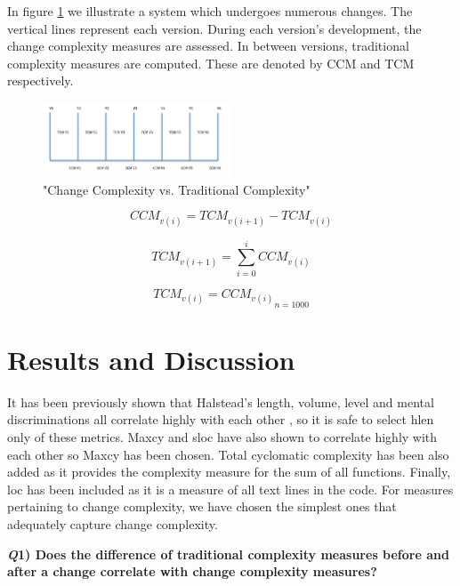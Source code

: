 \documentclass[9pt,twocolumn,a4paper]{article}
\begin{document}
In figure \ref{fig:ccVstc} we illustrate a system which undergoes numerous changes. The vertical lines represent each version. During each version's development, the change complexity measures are assessed. In between versions, traditional complexity measures are computed. These are denoted by CCM and TCM respectively.

\begin{figure}[h!]
  \centering
  \includegraphics[width=0.5\textwidth]{change_complexity_figure}
   \caption{"Change Complexity vs. Traditional Complexity"}
   \label{fig:ccVstc}
\end{figure}

\begin{equation}
{{CCM_{v(i)}} = {TCM_{v(i+1)}}-{TCM_{v(i)}}}
\end{equation}

\begin{equation}
{{TCM_{v(i+1)}} = \sum\limits_{i=0}^iCCM_{v(i)}}
\end{equation}
 
\begin{equation}
{{{TCM_{v(i)}} = CCM_{v(i)}}   _{n=1000}}
\end{equation}

\section{Results and Discussion}

It has been previously shown that Halstead's length, volume, level and mental discriminations all correlate highly with each other \cite{Israel}, so it is safe to select hlen only of these metrics. Maxcy and sloc have also shown to correlate highly with each other so Maxcy has been chosen. Total cyclomatic complexity has been also added as it provides the complexity measure for the sum of all functions. Finally, loc has been included as it is a measure of all text lines in the code. For measures pertaining to change complexity, we have chosen the simplest ones that adequately capture change complexity. 
\newline

{\bf{\emph Q1) Does the difference of traditional complexity measures before and after a change correlate with change complexity measures?}}
\newline
\end{document}
